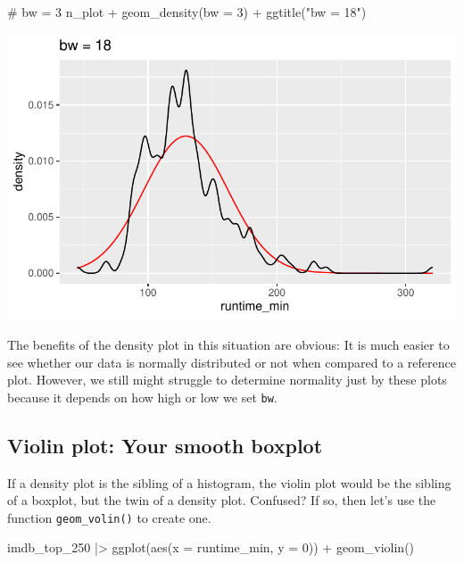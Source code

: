 \documentclass[
  letterpaper,
]{krantz}
\makeatletter
\newenvironment{Shaded}{\begin{snugshade}}{\end{snugshade}}
\newcommand{\AttributeTok}[1]{\textcolor[rgb]{0.40,0.45,0.13}{#1}}
\newcommand{\CommentTok}[1]{\textcolor[rgb]{0.37,0.37,0.37}{#1}}
\newcommand{\DecValTok}[1]{\textcolor[rgb]{0.68,0.00,0.00}{#1}}
\newcommand{\FunctionTok}[1]{\textcolor[rgb]{0.28,0.35,0.67}{#1}}
\newcommand{\NormalTok}[1]{\textcolor[rgb]{0.00,0.23,0.31}{#1}}
\newcommand{\SpecialCharTok}[1]{\textcolor[rgb]{0.37,0.37,0.37}{#1}}
\newcommand{\StringTok}[1]{\textcolor[rgb]{0.13,0.47,0.30}{#1}}
\newenvironment{kframe}{%
\medskip{}
\setlength{\fboxsep}{.8em}
 \def\at@end@of@kframe{}%
 \ifinner\ifhmode%
  \def\at@end@of@kframe{\end{minipage}}%
  \begin{minipage}{\columnwidth}%
 \fi\fi%
 \def\FrameCommand##1{\hskip\@totalleftmargin \hskip-\fboxsep
 \colorbox{shadecolor}{##1}\hskip-\fboxsep
     \hskip-\linewidth \hskip-\@totalleftmargin \hskip\columnwidth}%
 \MakeFramed {\advance\hsize-\width
   \@totalleftmargin\z@ \linewidth\hsize
   \@setminipage}}%
 {\par\unskip\endMakeFramed%
 \at@end@of@kframe}
\renewenvironment{Shaded}{\begin{kframe}}{\end{kframe}}
\makeatother
\begin{document}
\begin{Shaded}
\begin{Highlighting}[]
\CommentTok{\# bw = 3}
\NormalTok{n\_plot }\SpecialCharTok{+}
  \FunctionTok{geom\_density}\NormalTok{(}\AttributeTok{bw =} \DecValTok{3}\NormalTok{) }\SpecialCharTok{+}
  \FunctionTok{ggtitle}\NormalTok{(}\StringTok{"bw = 18"}\NormalTok{)}
\end{Highlighting}
\end{Shaded}

\includegraphics{08_descriptive_statistics_files/figure-pdf/density-vs-normal-bw-settings-three-1.pdf}

The benefits of the density plot in this situation are obvious: It is
much easier to see whether our data is normally distributed or not when
compared to a reference plot. However, we still might struggle to
determine normality just by these plots because it depends on how high
or low we set \texttt{bw}.

\subsection{Violin plot: Your smooth
boxplot}\label{violin-plot-your-smooth-boxplot}

If a density plot is the sibling of a histogram, the violin plot would
be the sibling of a boxplot, but the twin of a density plot. Confused?
If so, then let's use the function \texttt{geom\_volin()} to create one.

\begin{Shaded}
\begin{Highlighting}[]
\NormalTok{imdb\_top\_250 }\SpecialCharTok{|\textgreater{}}
  \FunctionTok{ggplot}\NormalTok{(}\FunctionTok{aes}\NormalTok{(}\AttributeTok{x =}\NormalTok{ runtime\_min, }\AttributeTok{y =} \DecValTok{0}\NormalTok{)) }\SpecialCharTok{+}
  \FunctionTok{geom\_violin}\NormalTok{()}
\end{Highlighting}
\end{Shaded}
\end{document}
